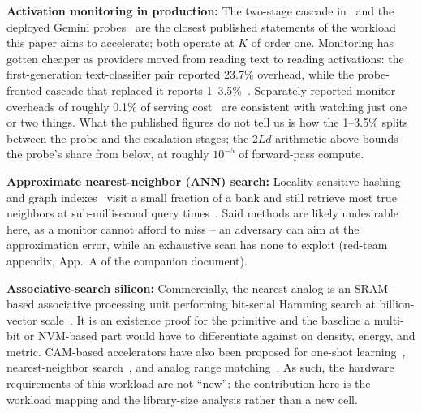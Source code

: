 \documentclass[conference]{IEEEtran}
\newcommand{\cam}{{CAM}\xspace}
\begin{document}
\textbf{Activation monitoring in production:} The two-stage cascade
in~\cite{ccpp2026,anthropic2026ccblog} and the deployed Gemini
probes~\cite{gemini2026probes} are the closest published statements of
the workload this paper aims to accelerate; both operate at $K$ of
order one.
Monitoring has gotten cheaper as providers moved from reading text to
reading activations: the first-generation text-classifier pair
reported 23.7\% overhead, while the probe-fronted cascade that
replaced it reports 1--3.5\%~\cite{cc2025,ccpp2026}. Separately
reported monitor overheads of roughly 0.1\% of serving
cost~\cite{anthropic2025cheapmonitors} are consistent with watching
just one or two things. What the published figures do not tell us is
how the 1--3.5\% splits between the probe and the escalation stages;
the $2Ld$ arithmetic above bounds the probe's share from below, at
roughly $10^{-5}$ of forward-pass compute.


\textbf{Approximate nearest-neighbor (ANN) search:}
Locality-sensitive
hashing~\cite{indyk1998lsh,charikar2002simhash} and graph
indexes~\cite{malkov2020hnsw} visit a small fraction of a bank and
still retrieve most true neighbors at sub-millisecond query
times~\cite{faisscuvs2025}. Said methods are likely undesirable
here, as a monitor cannot afford to miss -- an adversary can aim at
the approximation error, while an exhaustive scan has none to
exploit (red-team appendix, App.~A of the companion
document).

\textbf{Associative-search silicon:} Commercially, the nearest analog is
an SRAM-based associative processing unit performing bit-serial Hamming
search at billion-vector scale~\cite{gsi2025apu}. It is an existence
proof for the primitive and the baseline a multi-bit or NVM-based part
would have to differentiate against on density, energy, and metric.
\cam-based accelerators have also been proposed for one-shot
learning~\cite{ni2019fetcam}, nearest-neighbor
search~\cite{kazemi2021fefetcam}, and analog range
matching~\cite{li2020acam}. As such, the hardware requirements of
this workload are not ``new'': the contribution here is the workload
mapping and the library-size analysis rather than a new cell.
\end{document}
